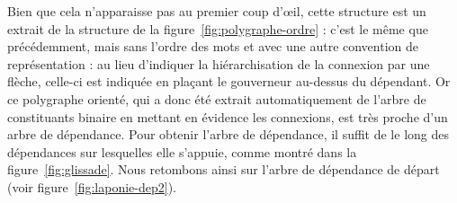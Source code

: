 Bien que cela n’apparaisse pas au premier coup d’œil, cette structure est un extrait de la structure de la figure~\ref{fig:polygraphe-ordre} : c’est le même  que précédemment, mais sans l’ordre des mots et avec une autre convention de représentation : au lieu d’indiquer la hiérarchisation de la connexion par une flèche, celle-ci est indiquée en plaçant le gouverneur au-dessus du dépendant. Or ce polygraphe orienté, qui a donc été extrait automatiquement de l’arbre de constituants binaire en mettant en évidence les connexions, est très proche d’un arbre de dépendance. Pour obtenir l’arbre de dépendance, il suffit de  le long des dépendances sur lesquelles elle s’appuie, comme montré dans la figure~\ref{fig:glissade}. Nous retombons ainsi sur l'arbre de dépendance de départ (voir figure~\ref{fig:laponie-dep2}).

